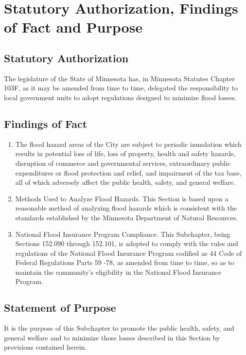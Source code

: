 
\setcounter{section}{89}
\section{Statutory Authorization, Findings of Fact and Purpose}
\subsection{Statutory Authorization}
The legislature of the State of Minnesota has, in Minnesota Statutes Chapter 103F, as it may be amended from time to time, delegated the responsibility to local government units to adopt regulations designed to minimize flood losses.
\subsection{Findings of Fact}
\begin{enumerate}[{\indent}1)]
    \item The flood hazard areas of the City are subject to periodic inundation which results in potential loss of life, loss of property, health and safety hazards, disruption of commerce and governmental services, extraordinary public expenditures or flood protection and relief, and impairment of the tax base, all of which adversely affect the public health, safety, and general welfare.
    \item Methods Used to Analyze Flood Hazards. This Section is based upon a reasonable method of analyzing flood hazards which is consistent with the standards established by the Minnesota Department of Natural Resources.
    \item National Flood Insurance Program Compliance. This Subchapter, being Sections 152.090 through 152.101, is adopted to comply with the rules and regulations of the National Flood Insurance Program codified as 44 Code of Federal Regulations Parts 59 -78, as amended from time to time, so as to maintain the community’s eligibility in the National Flood Insurance Program.
\end{enumerate}
\subsection{Statement of Purpose}
It is the purpose of this Subchapter to promote the public health, safety, and general welfare and to minimize those losses described in this Section by provisions contained herein.\\
